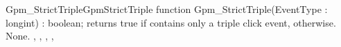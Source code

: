 \begin{functionl}{Gpm\_StrictTriple}{GpmStrictTriple}
\Declaration
function Gpm\_StrictTriple(EventType : longint) : boolean;
\Description
{} returns true if  contains only a
triple click event,  otherwise.
\Errors
None.
\SeeAlso
{},
,
, 
,
\end{functionl}
